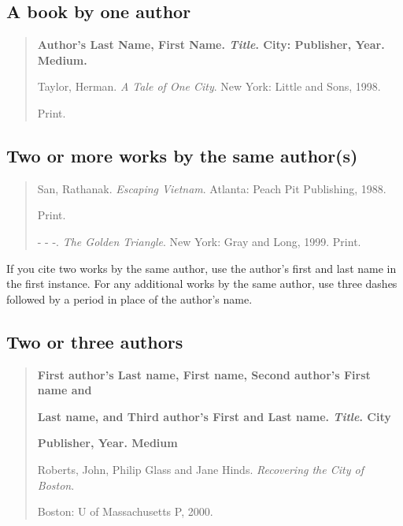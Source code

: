 \subsection{A book by one author}

\begin{quote}
\textbf{Author's Last Name, First Name. \emph{Title}. City: Publisher, Year. Medium.}

\medskip

Taylor, Herman. \emph{A Tale of One City}. New York: Little and Sons, 1998.
 
\hspace{.4in}Print.
\end{quote}
 
\subsection{Two or more works by the same author(s)}

\begin{quote}
San, Rathanak. \emph{Escaping Vietnam}. Atlanta: Peach Pit Publishing, 1988. 

\hspace{.4in}Print.

\medskip

- - -. \emph{The Golden Triangle}. New York: Gray and Long, 1999. Print.
\end{quote}

 If you cite two works by the same author, use the author's first and last name in the first instance. For any additional works by the same author, use three dashes followed by a period in place of the
author's name.

\subsection{Two or three authors}

\begin{quote}
\textbf{First author's Last name, First name, Second author's First name and}

\hspace{.4in}\textbf{Last name, and Third author's First and Last name. \emph{Title}. City}

\hspace{.4in}\textbf{Publisher, Year. Medium}
\medskip

Roberts, John, Philip Glass and Jane Hinds. \emph{Recovering the City of Boston}. 

\hspace{.4in}Boston: U of Massachusetts P, 2000.
\end{quote}

